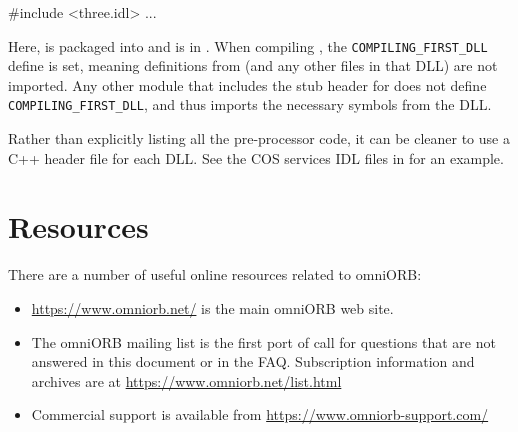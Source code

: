 \documentclass[11pt,oneside,a4paper]{book}
\newcommand{\code}[1]{\texttt{#1}}
\begin{document}
\begin{enumerate}
\begin{idllisting}
#include <three.idl>
...
\end{idllisting}

      Here,  is packaged into  and
       is in . When compiling
      , the \code{COMPILING\_FIRST\_DLL} define is
      set, meaning definitions from  (and any other
      files in that DLL) are not imported. Any other module that
      includes the stub header for  does not define
      \code{COMPILING\_FIRST\_DLL}, and thus imports the necessary
      symbols from the DLL.

      Rather than explicitly listing all the pre-processor code, it
      can be cleaner to use a C++ header file for each DLL. See the
      COS services IDL files in  for an example.

\end{enumerate}



\chapter{Resources}

There are a number of useful online resources related to omniORB:

\begin{itemize}

\item \url{https://www.omniorb.net/} is the main omniORB web
  site.

\item The omniORB mailing list is the first port of call for questions
  that are not answered in this document or in the FAQ. Subscription
  information and archives are at
  \url{https://www.omniorb.net/list.html}

\item Commercial support is available from
  \url{https://www.omniorb-support.com/}

\end{itemize}


\backmatter


\end{document}
